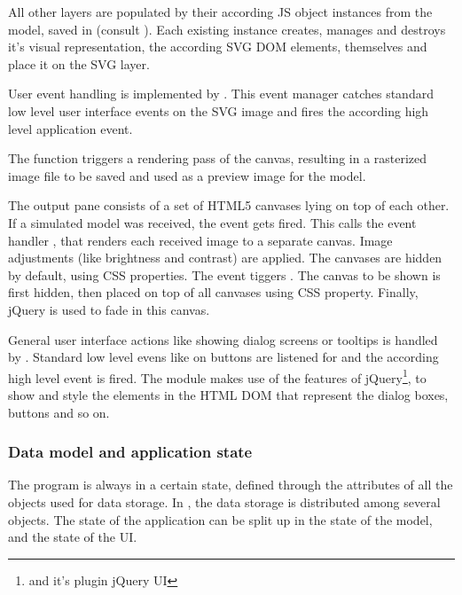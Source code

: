 All other layers are populated by their according JS object instances from the model, saved in  (consult ).
Each existing instance creates, manages and destroys it's visual representation, the according SVG DOM elements, themselves and place it on the SVG layer.

User event handling is implemented by .
This event manager catches standard low level user interface events on the SVG image and fires the according high level application event.

The function  triggers a rendering pass of the canvas, resulting in a rasterized image file to be saved and used as a preview image for the model.


The output pane  consists of a set of HTML5 canvases lying on top of each other.
If a simulated model was received, the event  gets fired.
This calls the event handler , that renders each received image to a separate canvas.
Image adjustments (like brightness and contrast) are applied.
The canvases are hidden by default, using CSS properties.
The event  tiggers .
The canvas to be shown is first hidden, then placed on top of all canvases using CSS  property.
Finally, jQuery is used to fade in this canvas.


General user interface actions like showing dialog screens or tooltips is handled by .
Standard low level evens like  on buttons are listened for and the according high level event is fired.
The module  makes use of the features of jQuery\footnote{and it's plugin jQuery UI}, to show and style the elements in the HTML DOM that represent the dialog boxes, buttons and so on.



\subsubsection{Data model and application state}
\label{sec:state}

The program is always in a certain state, defined through the attributes of all the objects used for data storage.
In \spl, the data storage is distributed among several objects.
The state of the application can be split up in the state of the model, and the state of the UI.

